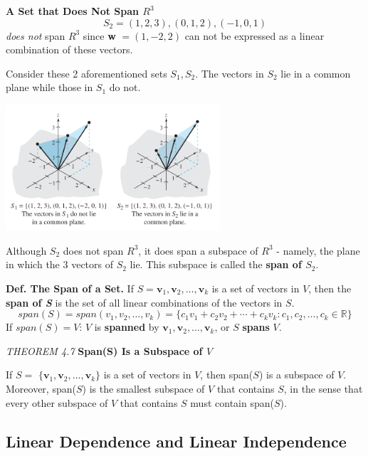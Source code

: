 \documentclass{article}
\newcommand\B{\textbf}
\newcommand\tcl{\begin{tcolorbox}[colback = {blue9}]}
\newcommand\etcl{\end{tcolorbox}}
\begin{document}
\begin{tcolorbox}
    \B{A Set that Does Not Span $R^3$}
    \[ S_2 = {(1,2,3), (0,1,2), (-1,0,1)}\]
    \textit{does not} span $R^3$ since \B{w} $= (1, -2, 2)$ can not be expressed as a linear combination of these vectors.
    
    Consider these 2 aforementioned sets $S_1, S_2$. The vectors in $S_2$ lie in a common plane while those in $S_1$
    do not.
    \begin{center}
        \includegraphics[width = 8cm]{images/S12span.png}
    \end{center}
    Although $S_2$ does not span $R^3$, it does span a subspace of $R^3$ - namely, the plane in which the 3 vectors of
    $S_2$ lie. This subspace is called the \B{span of $S_2$}.

    \tcl
        \B{Def. The Span of a Set.} 
        If $S = {\B{v}_1, \B{v}_2, \dots, \B{v}_k}$ is a set of vectors in $V$, then the \B{span of \textit{S}} is the set of
        all linear combinations of the vectors in $S$.
            \[ span(S) = span(v_1, v_2, \dots, v_k) = \{c_1v_1 + c_2v_2 + \cdots + c_kv_k : c_1, c_2, \dots, c_k \in \mathbb{R}\}\]
        If $span(S) = V$: $V$ is \B{spanned} by ${\B{v}_1, \B{v}_2, \dots, \B{v}_k}$, or $S$ \B{spans} $V$.
    \etcl 
    
    \tcl
    \textit{THEOREM 4.7} \quad \B{Span(S) Is a Subspace of $V$}

    If $S =$ $\{\B{v}_1, \B{v}_2, \dots, \B{v}_k\}$ is a set of vectors in $V$, then span($S$) is a subspace of $V$. Moreover,
    span($S$) is the smallest subspace of $V$ that contains $S$, in the sense that every other subspace of $V$ that
    contains $S$ must contain span($S$).
    \etcl 
    

    \subsection{Linear Dependence and Linear Independence}


\end{tcolorbox}
\end{document}
